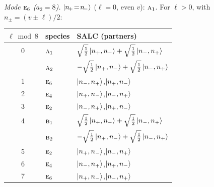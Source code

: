 \documentclass[11pt]{article}
\newcommand{\irr}[1]{\text{\normalfont\scshape #1}}
\begin{document}
\emph{Mode $\irr{e}_{6}$ ($a_2=8$).} $\ket{n_{\!+}\!=\!n_{\!-}}$ ($\ell=0$, even $v$): $\irr{a}_{1}$. For $\ell>0$, with $n_\pm=(v\pm\ell)/2$:
\begin{longtable}{c l l}\hline $\ell\bmod 8$ & species & SALC (partners)\\ \hline\endhead
0 & $\irr{a}_{1}$ & $\sqrt{\tfrac{1}{2}}\ket{n_+,n_-}+\sqrt{\tfrac{1}{2}}\ket{n_-,n_+}$\\
 & $\irr{a}_{2}$ & $-\sqrt{\tfrac{1}{2}}\ket{n_+,n_-}+\sqrt{\tfrac{1}{2}}\ket{n_-,n_+}$\\
1 & $\irr{e}_{6}$ & $\ket{n_-,n_+}$,\quad $\ket{n_+,n_-}$\\
2 & $\irr{e}_{4}$ & $\ket{n_+,n_-}$,\quad $\ket{n_-,n_+}$\\
3 & $\irr{e}_{2}$ & $\ket{n_-,n_+}$,\quad $\ket{n_+,n_-}$\\
4 & $\irr{b}_{1}$ & $\sqrt{\tfrac{1}{2}}\ket{n_+,n_-}+\sqrt{\tfrac{1}{2}}\ket{n_-,n_+}$\\
 & $\irr{b}_{2}$ & $-\sqrt{\tfrac{1}{2}}\ket{n_+,n_-}+\sqrt{\tfrac{1}{2}}\ket{n_-,n_+}$\\
5 & $\irr{e}_{2}$ & $\ket{n_+,n_-}$,\quad $\ket{n_-,n_+}$\\
6 & $\irr{e}_{4}$ & $\ket{n_-,n_+}$,\quad $\ket{n_+,n_-}$\\
7 & $\irr{e}_{6}$ & $\ket{n_+,n_-}$,\quad $\ket{n_-,n_+}$\\
\hline\end{longtable}
\end{document}
